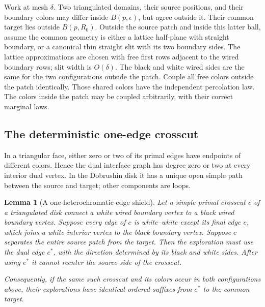 \documentclass[11pt]{article}
\newtheorem{lemma}[theorem]{Lemma}
\theoremstyle{definition}\newtheorem{definition}[theorem]{Definition}
\theoremstyle{remark}\newtheorem{remark}[theorem]{Remark}
\begin{document}
Work at mesh $\delta$. Two triangulated domains, their source positions,
and their boundary colors may differ inside $B(p,\epsilon)$, but agree
outside it. Their common target lies outside $B(p,R_0)$.
Outside the source patch and inside this latter ball, assume the common
geometry is either a lattice half-plane with straight boundary, or a
canonical thin straight slit with its two boundary sides. The lattice
approximations are chosen with free first rows adjacent to the wired
boundary rows; slit width is $O(\delta)$. The black and white wired sides
are the same for the two configurations outside the patch.
Couple all free colors outside the patch identically. Those shared colors
have the independent percolation law. The colors inside the patch may be
coupled arbitrarily, with their correct marginal laws.

\subsection{The deterministic one-edge crosscut}

In a triangular face, either zero or two of its primal edges have endpoints
of different colors. Hence the dual interface graph has degree zero or two
at every interior dual vertex. In the Dobrushin disk it has a unique open
simple path between the source and target; other components are loops.

\begin{lemma}[A one-heterochromatic-edge shield]
\label{lem:ss-oneedge}
Let a simple primal crosscut $c$ of a triangulated disk connect a white
wired boundary vertex to a black wired boundary vertex. Suppose every
edge of $c$ is white--white except its final edge $e$, which joins a white
\emph{interior} vertex to the black boundary vertex. Suppose $c$ separates
the entire source patch from the target. Then the exploration must use
the dual edge $e^*$, with the direction determined by its black and white
sides. After using $e^*$ it cannot reenter the source side of the crosscut.

Consequently, if the same such crosscut and its colors occur in both
configurations above, their explorations have identical ordered suffixes
from $e^*$ to the common target.
\end{lemma}
\end{document}
